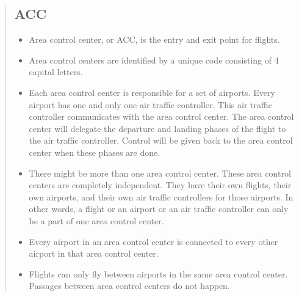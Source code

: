 \documentclass[10pt]{article}
\begin{document}
\begin{quote}
    
\subsection{\large\textbf{ACC}}
    \begin{itemize}
    
    \item Area control center, or ACC, is the entry and exit point for flights.
    
    \item Area control centers are identified by a unique code consisting of 4 capital letters. 
    
    \item Each area control center is responsible for a set of airports. Every airport has one and only one air traffic controller. This air traffic controller communicates with the area control center. The area control center will delegate the departure and landing phases of the flight to the air traffic controller. Control will be given back to the area control center when these phases are done.
    
    \item There might be more than one area control center. These area control centers are completely independent. They have their own flights, their own airports, and their own air traffic controllers for those airports. In other words, a flight or an airport or an air traffic controller can only be a part of one area control center. 
    
    \item Every airport in an area control center is connected to every other airport in that area control center. 
    
    \item Flights can only fly between airports in the same area control center. Passages between area control centers do not happen. 
    

\end{itemize}
\end{quote}
\end{document}
